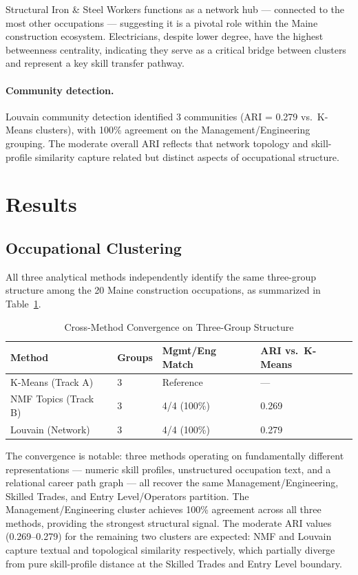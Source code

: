 \documentclass[12pt]{article}
\begin{document}
Structural Iron \& Steel Workers functions as a network hub ---
connected to the most other occupations --- suggesting it is a
pivotal role within the Maine construction ecosystem.
Electricians, despite lower degree, have the highest betweenness
centrality, indicating they serve as a critical bridge between
clusters and represent a key skill transfer pathway.

\paragraph{Community detection.}
Louvain community detection \cite{blondel2008} identified 3 communities
(ARI = 0.279 vs.\ K-Means clusters), with 100\% agreement on
the Management/Engineering grouping. The moderate overall ARI
reflects that network topology and skill-profile similarity
capture related but distinct aspects of occupational structure.

\section{Results}

\subsection{Occupational Clustering}

All three analytical methods independently identify the same
three-group structure among the 20 Maine construction
occupations, as summarized in Table~\ref{tab:convergence}.

\begin{table}[H]
\centering
\caption{Cross-Method Convergence on Three-Group Structure}
\label{tab:convergence}
\begin{tabular}{llll}
\toprule
\textbf{Method} & \textbf{Groups} & \textbf{Mgmt/Eng Match} & \textbf{ARI vs.\ K-Means} \\
\midrule
K-Means (Track A)   & 3 & Reference   & ---   \\
NMF Topics (Track B)& 3 & 4/4 (100\%) & 0.269 \\
Louvain (Network)   & 3 & 4/4 (100\%) & 0.279 \\
\bottomrule
\end{tabular}
\end{table}

The convergence is notable: three methods operating on fundamentally
different representations --- numeric skill profiles, unstructured
occupation text, and a relational career path graph --- all recover
the same Management/Engineering, Skilled Trades, and Entry
Level/Operators partition. The Management/Engineering cluster achieves
100\% agreement across all three methods, providing the strongest
structural signal. The moderate ARI values (0.269--0.279) for the
remaining two clusters are expected: NMF and Louvain capture
textual and topological similarity respectively, which partially
diverge from pure skill-profile distance at the Skilled Trades
and Entry Level boundary.
\end{document}
